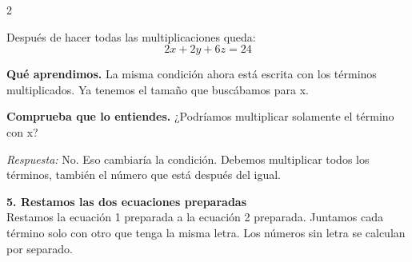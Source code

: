 \documentclass[11pt,a4paper,landscape]{article}
\begin{document}
\begin{multicols*}{2}
\begin{minipage}{\linewidth}
\par{}\par\smallskip
\par\smallskip Después de hacer todas las multiplicaciones queda:
\[2x + 2y + 6z = 24\]
\par\smallskip\textbf{Qué aprendimos.} La misma condición ahora está escrita con los términos multiplicados. Ya tenemos el tamaño que buscábamos para x.
\par\smallskip\textbf{Comprueba que lo entiendes.} ¿Podríamos multiplicar solamente el término con x?\par\textit{Respuesta:} No. Eso cambiaría la condición. Debemos multiplicar todos los términos, también el número que está después del igual.
\end{minipage}\par\medskip
\noindent\begin{minipage}{\linewidth}\textbf{5. Restamos las dos ecuaciones preparadas}\\[2pt]Restamos la ecuación 1 preparada a la ecuación 2 preparada. Juntamos cada término solo con otro que tenga la misma letra. Los números sin letra se calculan por separado.
\par{}\par\smallskip

\end{minipage}
\end{multicols*}
\end{document}
